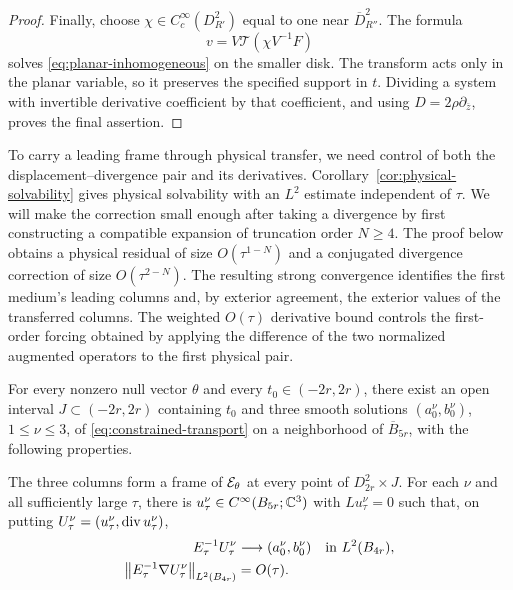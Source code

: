 \begin{proof}
Finally, choose $\chi\in C_c^\infty(D_{R'}^2)$ equal to one near
$\overline D_{R''}^2$. The formula
\[
 v=V\mathcal T(\chi V^{-1}F)
\]
solves \eqref{eq:planar-inhomogeneous} on the smaller disk.
The transform acts only in the planar variable, so it preserves
the specified support in $t$. Dividing a system with invertible
derivative coefficient by that coefficient, and using
$D=2\rho\partial_{\overline z}$, proves the final assertion.
\end{proof}

To carry a leading frame through physical transfer, we need control of
both the displacement--divergence pair and its derivatives.
Corollary~\ref{cor:physical-solvability} gives physical solvability with
an $L^2$ estimate independent of $\tau$. We will make the
correction small enough after taking a divergence by first constructing
a compatible expansion of truncation order $N\ge4$. The proof below
obtains a physical residual of size $O(\tau^{1-N})$ and a conjugated
divergence correction of size $O(\tau^{2-N})$. The resulting strong
convergence identifies the first medium's leading columns and, by exterior
agreement, the exterior values of the transferred columns. The weighted
$O(\tau)$ derivative bound controls the first-order forcing obtained by
applying the difference of the two normalized augmented operators to
the first physical pair.

\begin{proposition}
\label{prop:physical-amplitudes}
For every nonzero null vector $\theta$ and every
$t_0\in(-2r,2r)$, there exist an open interval
$J\subset(-2r,2r)$ containing $t_0$ and three smooth solutions
$(a_0^{\nu},b_0^{\nu})$, $1\le\nu\le3$, of
\eqref{eq:constrained-transport} on a neighborhood of
$\overline B_{5r}$, with the following properties.

The three columns form a frame of $\mathcal E_\theta$ at every point
of $D_{2r}^2\times J$. For each $\nu$ and all sufficiently large
$\tau$, there is $u_\tau^{\nu}\in C^\infty(B_{5r};\mathbb C^3)$ with
$Lu_\tau^{\nu}=0$ such that, on putting
$U_\tau^{\nu}=(u_\tau^{\nu},\operatorname{div} u_\tau^{\nu})$,
\begin{equation}
\label{eq:physical-leading-limit}
\begin{aligned}
 E_\tau^{-1}U_\tau^{\nu}
   &\longrightarrow (a_0^{\nu},b_0^{\nu})
                  &&\text{in }L^2(B_{4r}),\\
 \left\lVert E_\tau^{-1}\nabla U_\tau^{\nu}\right\rVert_{L^2(B_{4r})}
   &=O(\tau).
\end{aligned}
\end{equation}
\end{proposition}

